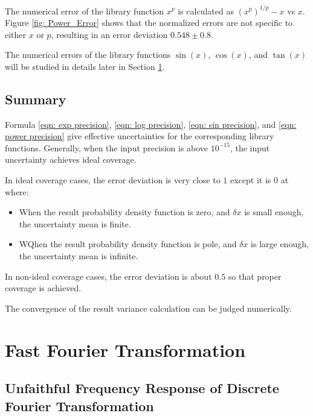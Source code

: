 \documentclass[twoside]{article}
\numberwithin{equation}{section}
\begin{document}
The numerical error of the library function $x^p$ is calculated as $(x^p)^{1/p} - x$ vs $x$.
Figure \ref{fig: Power_Error} shows that the normalized errors are not specific to either $x$ or $p$, resulting in an error deviation $0.548 \pm 0.8$.

The numerical errors of the library functions $\sin(x)$, $\cos(x)$, and $\tan(x)$ will be studied in details later in Section \ref{sec: FFT}.


\subsection{Summary}

Formula \eqref{eqn: exp precision}, \eqref{eqn: log precision}, \eqref{eqn: sin precision}, and \eqref{eqn: power precision} give effective uncertainties for the corresponding library functions.
Generally, when the input precision is above $10^{-15}$, the input uncertainty achieves ideal coverage.

In ideal coverage cases, the error deviation is very close to $1$ except it is $0$ at where:
\begin{itemize}
\item When the result probability density function is zero, and $\delta x$ is small enough, the uncertainty mean is finite.

\item WQhen the result probability density function is pole, and $\delta x$ is large enough, the uncertainty mean is infinite.

\end{itemize}
In non-ideal coverage cases, the error deviation is about $0.5$ so that proper coverage is achieved.

The convergence of the result variance calculation can be judged numerically.



\clearpage
\section{Fast Fourier Transformation}
\label{sec: FFT}


\subsection{Unfaithful Frequency Response of Discrete Fourier Transformation \cite{Prev_Precision_Arithmetic}}

\iffalse
\end{document}
